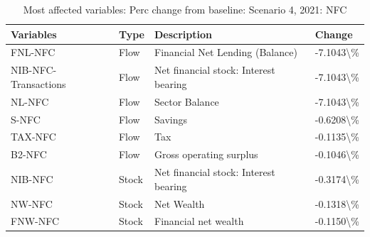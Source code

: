 \documentclass[
]{book}
\begin{document}
\begin{table}

\caption{\label{tab:most-affected-Scenario-4-perc-NFC}Most affected variables: Perc change from baseline: Scenario 4, 2021: NFC}
\centering
\fontsize{10}{12}\selectfont
\begin{tabular}[t]{l|l|l|l}
\hline
Variables & Type & Description & Change\\
\hline
FNL-NFC & Flow & Financial Net Lending (Balance) & -7.1043\textbackslash{}\%\\
\hline
NIB-NFC-Transactions & Flow & Net financial stock: Interest bearing & -7.1043\textbackslash{}\%\\
\hline
NL-NFC & Flow & Sector Balance & -7.1043\textbackslash{}\%\\
\hline
S-NFC & Flow & Savings & -0.6208\textbackslash{}\%\\
\hline
TAX-NFC & Flow & Tax & -0.1135\textbackslash{}\%\\
\hline
B2-NFC & Flow & Gross operating surplus & -0.1046\textbackslash{}\%\\
\hline
NIB-NFC & Stock & Net financial stock: Interest bearing & -0.3174\textbackslash{}\%\\
\hline
NW-NFC & Stock & Net Wealth & -0.1318\textbackslash{}\%\\
\hline
FNW-NFC & Stock & Financial net wealth & -0.1150\textbackslash{}\%\\
\hline
\end{tabular}
\end{table}
\end{document}
